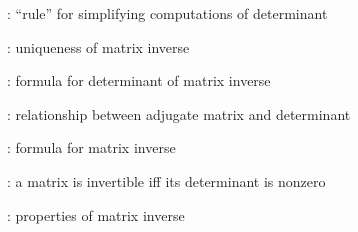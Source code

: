 \item {}: ``rule'' for simplifying computations of determinant
\item {}: uniqueness of matrix inverse
\item {}: formula for determinant of matrix inverse
\item {}: relationship between adjugate matrix and determinant
\item {}: formula for matrix inverse
\item {}: a matrix is invertible iff its determinant is nonzero
\item {}: properties of matrix inverse
